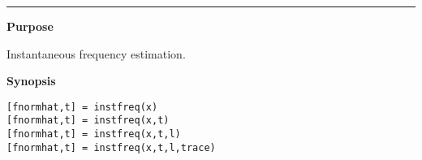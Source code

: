 


\hspace*{-1.6cm}{\Large \bf instfreq}

\vspace*{-.4cm}
\hspace*{-1.6cm}\rule[0in]{16.5cm}{.02cm}
\vspace*{.2cm}



{\bf \large {}\selectfont Purpose}\\
\hspace*{1.5cm}
\begin{minipage}[t]{13.5cm}
Instantaneous frequency estimation.
\end{minipage}
\vspace*{.1cm}


{\bf \large {}\selectfont Synopsis}\\
\hspace*{1.5cm}
\begin{minipage}[t]{13.5cm}
\begin{verbatim}
[fnormhat,t] = instfreq(x)
[fnormhat,t] = instfreq(x,t)
[fnormhat,t] = instfreq(x,t,l)
[fnormhat,t] = instfreq(x,t,l,trace)
\end{verbatim}
\end{minipage}
\vspace*{.5cm}


